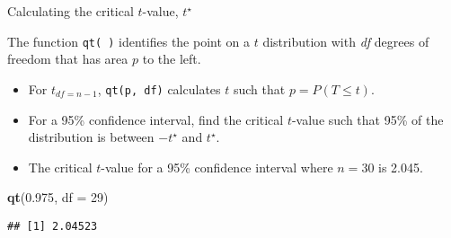 \documentclass[
  ignorenonframetext,
  aspectratio=169]{beamer}
\newenvironment{Shaded}{\begin{snugshade}}{\end{snugshade}}
\newcommand{\AttributeTok}[1]{\textcolor[rgb]{0.13,0.29,0.53}{#1}}
\newcommand{\DecValTok}[1]{\textcolor[rgb]{0.00,0.00,0.81}{#1}}
\newcommand{\FloatTok}[1]{\textcolor[rgb]{0.00,0.00,0.81}{#1}}
\newcommand{\FunctionTok}[1]{\textcolor[rgb]{0.13,0.29,0.53}{\textbf{#1}}}
\newcommand{\NormalTok}[1]{#1}
\begin{document}
\begin{frame}[fragile]{Calculating the critical \(t\)-value,
\(t^\star\)}
\protect\hypertarget{calculating-the-critical-t-value-tstar}{}
\small

The function \texttt{qt( )} identifies the point on a \(t\) distribution
with \emph{df} degrees of freedom that has area \(p\) to the left.

\begin{itemize}
\item
  For \(t_{df = n-1}\), \texttt{qt(p, df)} calculates \(t\) such that
  \(p = P(T \leq t)\).
\item
  For a 95\% confidence interval, find the critical \(t\)-value such
  that 95\% of the distribution is between \(-t^\star\) and \(t^\star\).
\item
  The critical \(t\)-value for a 95\% confidence interval where
  \(n = 30\) is 2.045.
\end{itemize}

\scriptsize

\begin{Shaded}
\begin{Highlighting}[]
\FunctionTok{qt}\NormalTok{(}\FloatTok{0.975}\NormalTok{, }\AttributeTok{df =} \DecValTok{29}\NormalTok{)}
\end{Highlighting}
\end{Shaded}

\begin{verbatim}
## [1] 2.04523
\end{verbatim}
\end{frame}
\end{document}
